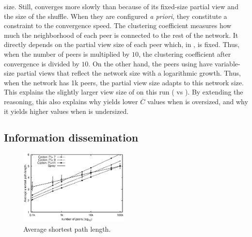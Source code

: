 \begin{asparadesc}
  size. Still, \CYCLON converges more slowly than \SPRAY because of
  its fixed-size partial view and the size of the shuffle. When they
  are configured \emph{a priori}, they constitute a constraint to the
  convergence speed.  The clustering coefficient measures how much the
  neighborhood of each peer is connected to the rest of the
  network. It directly depends on the partial view size of each peer
  which, in \CYCLON, is fixed. Thus, when the number of peers is
  multiplied by $10$, the clustering coefficient after convergence is
  divided by $10$. On the other hand, the peers using \SPRAY have
  variable-size partial views that reflect the network size with a
  logarithmic growth. Thus, when the network has 1k peers, the partial
  view size adapts to this network size. This explains the slightly
  larger view size of \SPRAY on this run ( vs ). By
  extending the reasoning, this also explains why \SPRAY yields lower
  $\overline{C}$ values when \CYCLON is oversized, and why it yields
  higher values when \CYCLON is undersized.
\end{asparadesc}

\subsection{Information dissemination}

\begin{figure}
  \centering
  \includegraphics[width=0.49\textwidth]{img/avgpath.eps}
  \caption{\label{fig:avgpath}Average shortest path length.}
\end{figure}

